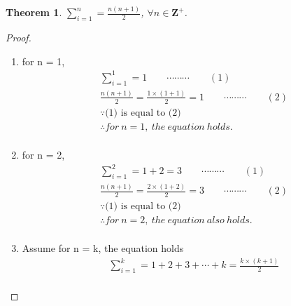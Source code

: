 \documentclass{amsart}
\begin{document}
	\newtheorem{thm}{Theorem}
	\begin{thm}
		$\displaystyle\sum_{i=1}^{n} = \frac{n(n+1)}{2}$, $\forall n \in \mathbf{Z}^+$.
	\end{thm}

	\begin{proof}
	\ \\
	\begin{enumerate}
		\item{for n = 1,}
		\begin{align*}
			& \displaystyle\sum_{i=1}^{1} = 1 \qquad \cdots \cdots \cdots \qquad (1)\\[12pt]
			& \frac{n(n+1)}{2} = \frac{1 \times (1+1)}{2}=1 \qquad \cdots \cdots \cdots \qquad (2)\\[12pt]
			& \because \text{(1) is equal to (2)}\\[12pt]
			& \therefore for\ n = 1,\ the\ equation\ holds.\\[12pt]
		\end{align*}
		
		\item{for n = 2,}
		\begin{align*}
			& \displaystyle\sum_{i=1}^{2} = 1 + 2 = 3 \qquad \cdots \cdots \cdots \qquad (1)\\[12pt]
			& \frac{n(n+1)}{2} = \frac{2 \times (1+2)}{2}=3 \qquad \cdots \cdots \cdots \qquad (2)\\[12pt]
			& \because \text{(1) is equal to (2)}\\[12pt]
			& \therefore for\ n = 2,\ the\ equation\ also\ holds.\\[12pt]
		\end{align*}
		
		\item{Assume for n = k, the equation holds}
		\begin{align*}
			& \displaystyle\sum_{i=1}^{k} = 1 + 2 + 3 + \cdots + k = \frac{k \times (k+1)}{2}\\[12pt]
		\end{align*}
        

\end{enumerate}
\end{proof}
\end{document}

